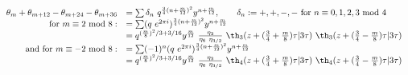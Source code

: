 \begin{equation*}
  \begin{array}{rl}
\theta_m + \theta_{m+12} - \theta_{m+24} - \theta_{m+36} 
&=  \sum \delta_n ~q^{{3\over 4}(n+{m\over 12})^2} y^{n+{m\over 12}},
\qquad \delta_n :=+,+,-,- \textrm{ for } n\equiv 0,1,2,3
\textrm{ mod } 4\\
\textrm{ for }m\equiv 2 \textrm{ mod } 8: &= \sum (q ~e^{2\pi
   i})^{{3\over 4}(n+{m\over 12})^2} y^{n+{m\over 12}} \qquad\\
&= q^{({m\over 8})^2/3 + 3/16} y^{m\over 12}~{\eta_3\over\eta_6~\eta_{3/2}}
~\th_3(z +({3\over 4}+{m\over 8})\tau|3\tau)
~\th_3(z +({3\over 4}-{m\over 8})\tau|3\tau) \\
\textrm{ and for} ~m\equiv -2 \textrm{ mod } 8: &=\sum (-1)^n (q ~e^{2\pi
   i})^{{3\over 4}(n+{m\over 12})^2} y^{n+{m\over 12}} \qquad \\
&= q^{({m\over 8})^2/3 + 3/16} y^{m\over 12}~{\eta_3\over\eta_6~\eta_{3/2}}
~\th_4(z +({3\over 4}+{m\over 8})\tau|3\tau) 
~\th_4(z +({3\over 4}-{m\over 8})\tau|3\tau) 
  \end{array}
\end{equation*}

